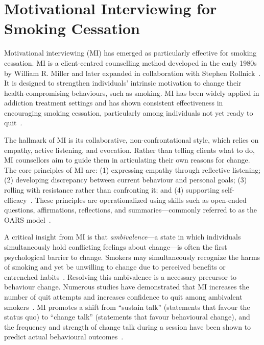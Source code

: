 \section{Motivational Interviewing for Smoking Cessation}

Motivational interviewing (MI) has emerged as particularly effective for smoking cessation. MI is a client-centred counselling method developed in the early 1980s by William R. Miller and later expanded in collaboration with Stephen Rollnick~\cite{miller1991motivational,MillerRollnick2023}. It is designed to strengthen individuals' intrinsic motivation to change their health-compromising behaviours, such as smoking. MI has been widely applied in addiction treatment settings and has shown consistent effectiveness in encouraging smoking cessation, particularly among individuals not yet ready to quit~\cite{bischof2021evidence,doi:10.1177/1049731509347850}.

The hallmark of MI is its collaborative, non-confrontational style, which relies on empathy, active listening, and evocation. Rather than telling clients what to do, MI counsellors aim to guide them in articulating their own reasons for change. The core principles of MI are: (1) expressing empathy through reflective listening; (2) developing discrepancy between current behaviour and personal goals; (3) rolling with resistance rather than confronting it; and (4) supporting self-efficacy~\cite{rollnick2008motivational}. These principles are operationalized using skills such as open-ended questions, affirmations, reflections, and summaries---commonly referred to as the OARS model~\cite{Miller_2023}.

A critical insight from MI is that \emph{ambivalence}---a state in which individuals simultaneously hold conflicting feelings about change---is often the first psychological barrier to change. Smokers may simultaneously recognize the harms of smoking and yet be unwilling to change due to perceived benefits or entrenched habits~\cite{brown2023mi}. Resolving this ambivalence is a necessary precursor to behaviour change. Numerous studies have demonstrated that MI increases the number of quit attempts and increases confidence to quit among ambivalent smokers~\cite{Abar2013, Gwaltney2009-wj}. MI promotes a shift from ``sustain talk'' (statements that favour the status quo) to ``change talk'' (statements that favour behavioural change), and the frequency and strength of change talk during a session have been shown to predict actual behavioural outcomes~\cite{Apodaca2009}.

